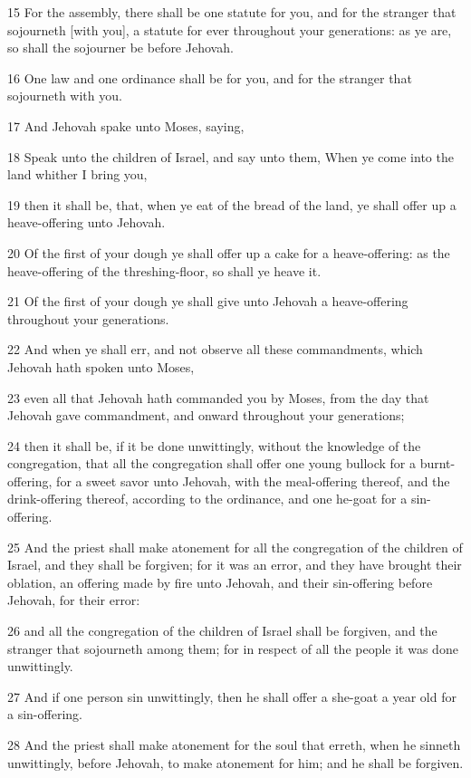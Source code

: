 \par 15 For the assembly, there shall be one statute for you, and for the stranger that sojourneth [with you], a statute for ever throughout your generations: as ye are, so shall the sojourner be before Jehovah.
\par 16 One law and one ordinance shall be for you, and for the stranger that sojourneth with you.
\par 17 And Jehovah spake unto Moses, saying,
\par 18 Speak unto the children of Israel, and say unto them, When ye come into the land whither I bring you,
\par 19 then it shall be, that, when ye eat of the bread of the land, ye shall offer up a heave-offering unto Jehovah.
\par 20 Of the first of your dough ye shall offer up a cake for a heave-offering: as the heave-offering of the threshing-floor, so shall ye heave it.
\par 21 Of the first of your dough ye shall give unto Jehovah a heave-offering throughout your generations.
\par 22 And when ye shall err, and not observe all these commandments, which Jehovah hath spoken unto Moses,
\par 23 even all that Jehovah hath commanded you by Moses, from the day that Jehovah gave commandment, and onward throughout your generations;
\par 24 then it shall be, if it be done unwittingly, without the knowledge of the congregation, that all the congregation shall offer one young bullock for a burnt-offering, for a sweet savor unto Jehovah, with the meal-offering thereof, and the drink-offering thereof, according to the ordinance, and one he-goat for a sin-offering.
\par 25 And the priest shall make atonement for all the congregation of the children of Israel, and they shall be forgiven; for it was an error, and they have brought their oblation, an offering made by fire unto Jehovah, and their sin-offering before Jehovah, for their error:
\par 26 and all the congregation of the children of Israel shall be forgiven, and the stranger that sojourneth among them; for in respect of all the people it was done unwittingly.
\par 27 And if one person sin unwittingly, then he shall offer a she-goat a year old for a sin-offering.
\par 28 And the priest shall make atonement for the soul that erreth, when he sinneth unwittingly, before Jehovah, to make atonement for him; and he shall be forgiven.
